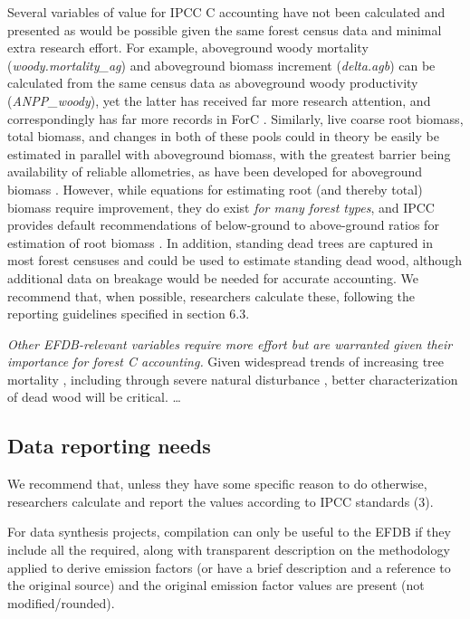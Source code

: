 \documentclass[, manuscript]{copernicus}
\begin{document}
Several variables of value for IPCC C accounting have not been
calculated and presented as would be possible given the same forest
census data and minimal extra research effort. For example, aboveground
woody mortality (\emph{woody.mortality\_ag}) and aboveground biomass
increment (\emph{delta.agb}) can be calculated from the same census data
as aboveground woody productivity (\emph{ANPP\_woody}), yet the latter
has received far more research attention, and correspondingly has far
more records in ForC \citetext{\citealp[Table
2,][]{anderson-teixeira_carbon_2021}; \citealp[but
see][]{piponiot_distribution_2022}}. Similarly, live coarse root
biomass, total biomass, and changes in both of these pools could in
theory be easily be estimated in parallel with aboveground biomass, with
the greatest barrier being availability of reliable allometries, as have
been developed for aboveground biomass
\citep{chave_improved_2014, rejou-mechain_biomass_2017, gonzalez-akre_allodb_2022}.
However, while equations for estimating root (and thereby total) biomass
require improvement, they do exist \emph{for many forest
types}\citep{refs}, and IPCC provides default recommendations of
below-ground to above-ground ratios for estimation of root biomass
\citep{ipcc_2019_2019}. In addition, standing dead trees are captured in
most forest censuses and could be used to estimate standing dead wood,
although additional data on breakage would be needed for accurate
accounting. We recommend that, when possible, researchers calculate
these, following the reporting guidelines specified in section 6.3.

\emph{Other EFDB-relevant variables require more effort but are
warranted given their importance for forest C accounting.} Given
widespread trends of increasing tree mortality \citep{refs}, including
through severe natural disturbance \citep{refs}, better characterization
of dead wood will be critical. \ldots{}

\subsection{Data reporting needs}

We recommend that, unless they have some specific reason to do
otherwise, researchers calculate and report the values according to IPCC
standards (3).

For data synthesis projects, compilation can only be useful to the EFDB
if they include all the required, along with transparent description on
the methodology applied to derive emission factors (or have a brief
description and a reference to the original source) and the original
emission factor values are present (not modified/rounded).
\end{document}
